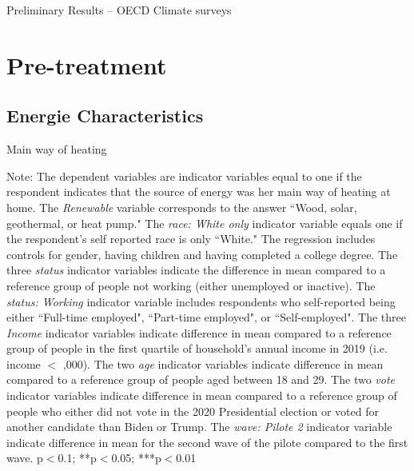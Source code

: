 \documentclass{article}
\begin{document}
\begin{LARGE}
	\begin{center}
		Preliminary Results – OECD Climate surveys	
	\end{center}
	
\end{LARGE}
	\tableofcontents
	\listoftables

\clearpage

\section{Pre-treatment}

\subsection{Energie Characteristics}

\begin{table}[h!]
	\caption{Main way of heating} \label{table heating}
	\begin{center}
		\scalebox{0.7}{}
	\end{center}
	{\footnotesize Note: The dependent variables are indicator variables equal to one if the respondent indicates that the source of energy was her main way of heating at home. The \textit{Renewable} variable corresponds to the answer ``Wood, solar, geothermal, or heat pump."
	The \textit{race: White only} indicator variable equals one if the respondent's self reported race is only ``White." The regression includes controls for gender, having children and having completed a college degree. The three \textit{status} indicator variables indicate the difference in mean compared to a reference group of people not working (either unemployed or inactive). The \textit{status: Working} indicator variable includes respondents who self-reported being either ``Full-time employed", ``Part-time employed", or ``Self-employed". The three \textit{Income} indicator variables indicate difference in mean compared to a reference group of people in the first quartile of household's annual income in 2019 (i.e. income $<$ ,000). The two \textit{age} indicator variables indicate difference in mean compared to a reference group of people aged between 18 and 29. The two \textit{vote} indicator variables indicate difference in mean compared to a reference group of people who either did not vote in the 2020 Presidential election or voted for another candidate than Biden or Trump. The \textit{wave: Pilote 2} indicator variable indicate difference in mean for the second wave of the pilote compared to the first wave.
	\newline  *p$<$0.1; **p$<$0.05; ***p$<$0.01}
\end{table}	
\end{document}
